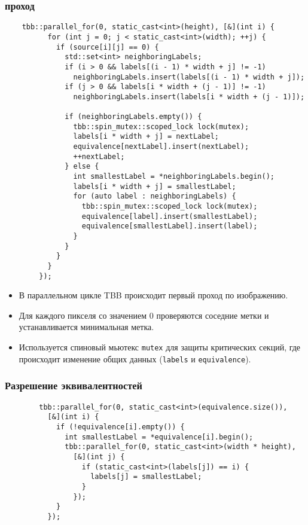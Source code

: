 \documentclass[a4paper, 14pt]{article}
\begin{document}
        \subsubsection*{ проход}
        
        \begin{verbatim}
    tbb::parallel_for(0, static_cast<int>(height), [&](int i) {
          for (int j = 0; j < static_cast<int>(width); ++j) {
            if (source[i][j] == 0) {
              std::set<int> neighboringLabels;
              if (i > 0 && labels[(i - 1) * width + j] != -1)
                neighboringLabels.insert(labels[(i - 1) * width + j]);
              if (j > 0 && labels[i * width + (j - 1)] != -1)
                neighboringLabels.insert(labels[i * width + (j - 1)]);
        
              if (neighboringLabels.empty()) {
                tbb::spin_mutex::scoped_lock lock(mutex);
                labels[i * width + j] = nextLabel;
                equivalence[nextLabel].insert(nextLabel);
                ++nextLabel;
              } else {
                int smallestLabel = *neighboringLabels.begin();
                labels[i * width + j] = smallestLabel;
                for (auto label : neighboringLabels) {
                  tbb::spin_mutex::scoped_lock lock(mutex);
                  equivalence[label].insert(smallestLabel);
                  equivalence[smallestLabel].insert(label);
                }
              }
            }
          }
        });
        \end{verbatim}
        
        \begin{itemize}
          \item В параллельном цикле TBB происходит первый проход по изображению.
          \item Для каждого пикселя со значением 0 проверяются соседние метки и устанавливается минимальная метка.
          \item Используется спиновый мьютекс \texttt{mutex} для защиты критических секций, где происходит изменение общих данных (\texttt{labels} и \texttt{equivalence}).
        \end{itemize}
        
        \subsubsection*{\centering Разрешение эквивалентностей}
        
        \begin{verbatim}
        tbb::parallel_for(0, static_cast<int>(equivalence.size()),
          [&](int i) {
            if (!equivalence[i].empty()) {
              int smallestLabel = *equivalence[i].begin();
              tbb::parallel_for(0, static_cast<int>(width * height),
                [&](int j) {
                  if (static_cast<int>(labels[j]) == i) {
                    labels[j] = smallestLabel;
                  }
                });
            }
          });
        \end{verbatim}
\end{document}
